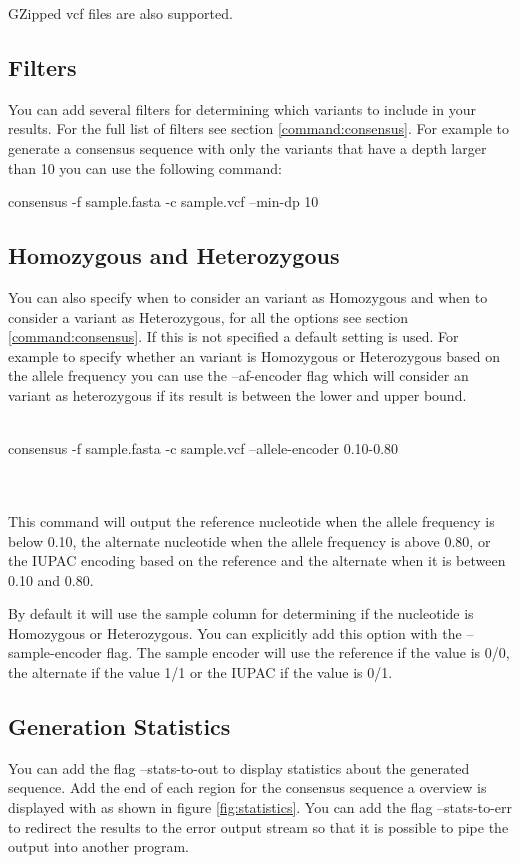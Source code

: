 GZipped vcf files are also supported.

\subsection{Filters}
You can add several filters for determining which variants to include in your results. For the full list of filters see section \ref{command:consensus}. For example to generate a consensus sequence with only the variants that have a depth larger than 10 you can use the following command:\\
\begin{markdown}
consensus -f sample.fasta -c sample.vcf --min-dp 10
\end{markdown}

\subsection{Homozygous and Heterozygous}
You can also specify when to consider an variant as Homozygous and when to consider a variant as Heterozygous, for all the options see section \ref{command:consensus}. If this is not specified a default setting is used. For example to specify whether an variant is Homozygous or Heterozygous based on the allele frequency you can use the --af-encoder flag which will consider an variant as heterozygous if its result is between the lower and upper bound.
\\
\\
\begin{markdown}
consensus -f sample.fasta -c sample.vcf --allele-encoder 0.10-0.80
\end{markdown}
\\
\\
This command will output the reference nucleotide when the allele frequency is below 0.10, the alternate nucleotide when the allele  frequency is above 0.80, or the IUPAC encoding based on the reference and the alternate when it is between 0.10 and 0.80.

By default it will use the sample column for determining if the nucleotide is Homozygous or Heterozygous. You can explicitly add this option with the --sample-encoder flag. The sample encoder will use the reference if the value is 0/0, the alternate if the value 1/1 or the IUPAC if the value is 0/1.

\subsection{Generation Statistics}\label{sec:statistics}
You can add the flag --stats-to-out to display statistics about the generated sequence.
Add the end of each region for the consensus sequence a overview is displayed with as shown in figure \ref{fig:statistics}. You can add the flag --stats-to-err to redirect the results to the error output stream so that it is possible to pipe the output into another program.

